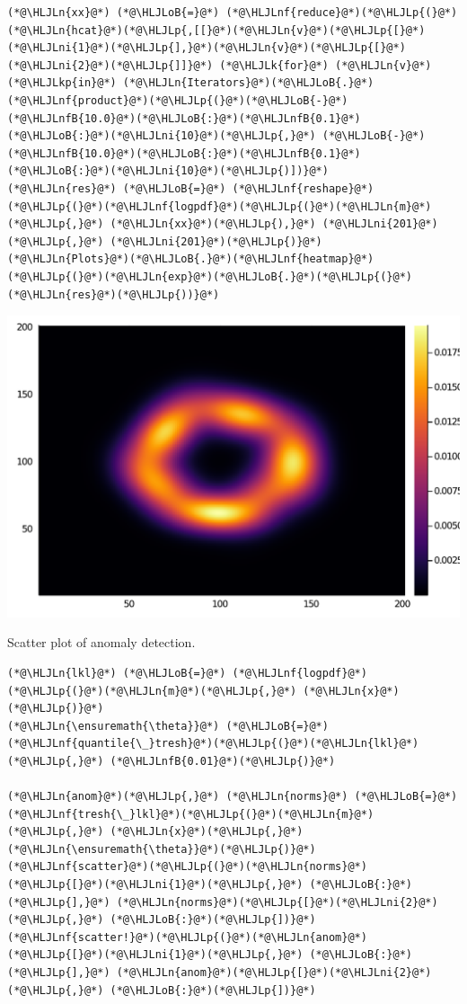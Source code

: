 \documentclass[12pt,a4paper]{article}
\newcommand{\HLJLk}[1]{\textcolor[RGB]{148,91,176}{\textbf{#1}}}
\newcommand{\HLJLkp}[1]{\textcolor[RGB]{148,91,176}{\textbf{#1}}}
\newcommand{\HLJLn}[1]{#1}
\newcommand{\HLJLnf}[1]{\textcolor[RGB]{66,102,213}{#1}}
\newcommand{\HLJLnfB}[1]{\textcolor[RGB]{59,151,46}{#1}}
\newcommand{\HLJLni}[1]{\textcolor[RGB]{59,151,46}{#1}}
\newcommand{\HLJLoB}[1]{\textcolor[RGB]{102,102,102}{\textbf{#1}}}
\newcommand{\HLJLp}[1]{#1}
\begin{document}
\begin{lstlisting}
(*@\HLJLn{xx}@*) (*@\HLJLoB{=}@*) (*@\HLJLnf{reduce}@*)(*@\HLJLp{(}@*)(*@\HLJLn{hcat}@*)(*@\HLJLp{,[[}@*)(*@\HLJLn{v}@*)(*@\HLJLp{[}@*)(*@\HLJLni{1}@*)(*@\HLJLp{],}@*)(*@\HLJLn{v}@*)(*@\HLJLp{[}@*)(*@\HLJLni{2}@*)(*@\HLJLp{]]}@*) (*@\HLJLk{for}@*) (*@\HLJLn{v}@*) (*@\HLJLkp{in}@*) (*@\HLJLn{Iterators}@*)(*@\HLJLoB{.}@*)(*@\HLJLnf{product}@*)(*@\HLJLp{(}@*)(*@\HLJLoB{-}@*)(*@\HLJLnfB{10.0}@*)(*@\HLJLoB{:}@*)(*@\HLJLnfB{0.1}@*)(*@\HLJLoB{:}@*)(*@\HLJLni{10}@*)(*@\HLJLp{,}@*) (*@\HLJLoB{-}@*)(*@\HLJLnfB{10.0}@*)(*@\HLJLoB{:}@*)(*@\HLJLnfB{0.1}@*)(*@\HLJLoB{:}@*)(*@\HLJLni{10}@*)(*@\HLJLp{)])}@*)
(*@\HLJLn{res}@*) (*@\HLJLoB{=}@*) (*@\HLJLnf{reshape}@*)(*@\HLJLp{(}@*)(*@\HLJLnf{logpdf}@*)(*@\HLJLp{(}@*)(*@\HLJLn{m}@*)(*@\HLJLp{,}@*) (*@\HLJLn{xx}@*)(*@\HLJLp{),}@*) (*@\HLJLni{201}@*)(*@\HLJLp{,}@*) (*@\HLJLni{201}@*)(*@\HLJLp{)}@*)
(*@\HLJLn{Plots}@*)(*@\HLJLoB{.}@*)(*@\HLJLnf{heatmap}@*)(*@\HLJLp{(}@*)(*@\HLJLn{exp}@*)(*@\HLJLoB{.}@*)(*@\HLJLp{(}@*)(*@\HLJLn{res}@*)(*@\HLJLp{))}@*)
\end{lstlisting}

\includegraphics[width=\linewidth]{jl_uOl600/test1_8_1.pdf}

Scatter plot of anomaly detection.


\begin{lstlisting}
(*@\HLJLn{lkl}@*) (*@\HLJLoB{=}@*) (*@\HLJLnf{logpdf}@*)(*@\HLJLp{(}@*)(*@\HLJLn{m}@*)(*@\HLJLp{,}@*) (*@\HLJLn{x}@*)(*@\HLJLp{)}@*)
(*@\HLJLn{\ensuremath{\theta}}@*) (*@\HLJLoB{=}@*) (*@\HLJLnf{quantile{\_}tresh}@*)(*@\HLJLp{(}@*)(*@\HLJLn{lkl}@*)(*@\HLJLp{,}@*) (*@\HLJLnfB{0.01}@*)(*@\HLJLp{)}@*)

(*@\HLJLn{anom}@*)(*@\HLJLp{,}@*) (*@\HLJLn{norms}@*) (*@\HLJLoB{=}@*) (*@\HLJLnf{tresh{\_}lkl}@*)(*@\HLJLp{(}@*)(*@\HLJLn{m}@*)(*@\HLJLp{,}@*) (*@\HLJLn{x}@*)(*@\HLJLp{,}@*) (*@\HLJLn{\ensuremath{\theta}}@*)(*@\HLJLp{)}@*)
(*@\HLJLnf{scatter}@*)(*@\HLJLp{(}@*)(*@\HLJLn{norms}@*)(*@\HLJLp{[}@*)(*@\HLJLni{1}@*)(*@\HLJLp{,}@*) (*@\HLJLoB{:}@*)(*@\HLJLp{],}@*) (*@\HLJLn{norms}@*)(*@\HLJLp{[}@*)(*@\HLJLni{2}@*)(*@\HLJLp{,}@*) (*@\HLJLoB{:}@*)(*@\HLJLp{])}@*)
(*@\HLJLnf{scatter!}@*)(*@\HLJLp{(}@*)(*@\HLJLn{anom}@*)(*@\HLJLp{[}@*)(*@\HLJLni{1}@*)(*@\HLJLp{,}@*) (*@\HLJLoB{:}@*)(*@\HLJLp{],}@*) (*@\HLJLn{anom}@*)(*@\HLJLp{[}@*)(*@\HLJLni{2}@*)(*@\HLJLp{,}@*) (*@\HLJLoB{:}@*)(*@\HLJLp{])}@*)
\end{lstlisting}
\end{document}
